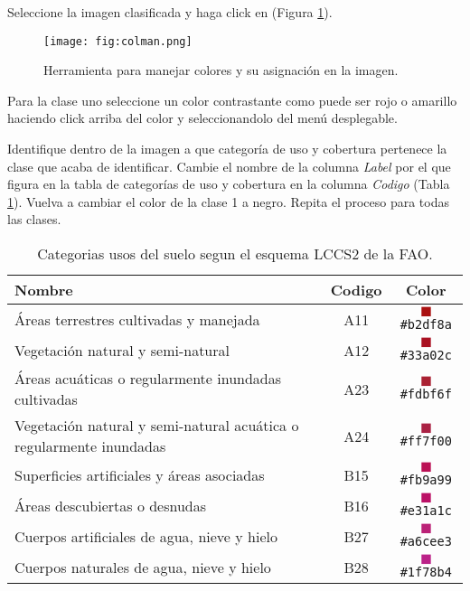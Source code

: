 Seleccione la imagen clasificada y haga click en  (Figura \ref{fig:colman}).

\begin{figure}[h!]
    \centering
    \texttt{[image: fig:colman.png]}
    \caption{Herramienta para manejar colores y su asignación en la imagen.}
    \label{fig:colman}
\end{figure}

Para la clase uno seleccione un color contrastante como puede ser rojo o amarillo haciendo click arriba del color y seleccionandolo del menú desplegable.

Identifique dentro de la imagen a que categoría de uso y cobertura pertenece la clase que acaba de identificar.  Cambie el nombre de la columna \emph{Label} por el que figura en la tabla de categorías de uso y cobertura en la columna \emph{Codigo} (Tabla \ref{tab:usos}). Vuelva a cambiar el color de la clase 1 a negro. Repita el proceso para todas las clases.

\begin{table}[hbt]
    \centering
    \begin{tabular}{p{11cm}cc}
        \toprule
        Nombre & Codigo & Color \\
        \midrule
        Áreas terrestres cultivadas y manejada & A11 & \textcolor{A11}{$\blacksquare$}\texttt{\#b2df8a}
        \\
        Vegetación natural y semi-natural & A12 & \textcolor{A12}{$\blacksquare$}\texttt{\#33a02c}\\
        Áreas acuáticas o regularmente inundadas cultivadas & A23  &
        \textcolor{A23}{$\blacksquare$}\texttt{\#fdbf6f}\\
        Vegetación natural y semi-natural acuática o
	regularmente inundadas & A24 & \textcolor{A24}{$\blacksquare$}\texttt{\#ff7f00}\\
        Superficies artificiales y áreas asociadas & B15  &
        \textcolor{B15}{$\blacksquare$}\texttt{\#fb9a99}\\
        Áreas descubiertas o desnudas & B16 & \textcolor{B16}{$\blacksquare$}\texttt{\#e31a1c}\\
        Cuerpos artificiales de agua, nieve y hielo & B27 &
        \textcolor{B27}{$\blacksquare$}\texttt{\#a6cee3}\\
        Cuerpos naturales de agua, nieve y hielo & B28&
        \textcolor{B28}{$\blacksquare$}\texttt{\#1f78b4}\\
        \bottomrule
    \end{tabular}
\caption{\label{tab:usos}Categorias usos del suelo segun el esquema LCCS2 de la FAO.}
\end{table}

